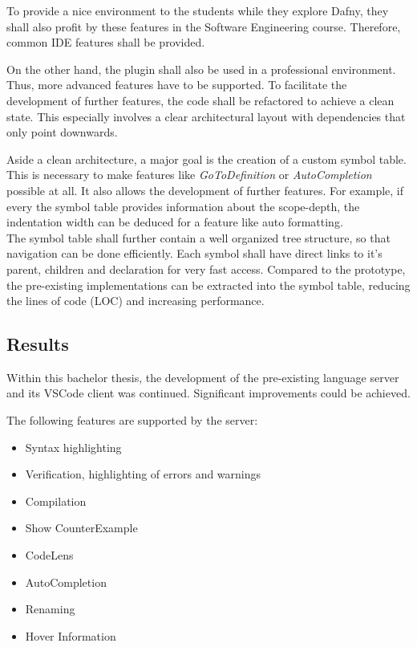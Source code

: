 To provide a nice environment to the students while they explore Dafny, they shall also profit by these features in the Software Engineering course.
Therefore, common IDE features shall be provided.

On the other hand, the plugin shall also be used in a professional environment.
Thus, more advanced features have to be supported.
To facilitate the development of further features, the code shall be refactored to achieve a clean state.
This especially involves a clear architectural layout with dependencies that only point downwards.

Aside a clean architecture, a major goal is the creation of a custom symbol table.
This is necessary to make features like \textit{GoToDefinition} or \textit{AutoCompletion} possible at all.
It also allows the development of further features.
For example, if every the symbol table provides information about the scope-depth, the indentation width can be deduced for a feature like auto formatting.\\

The symbol table shall further contain a well organized tree structure, so that navigation can be done efficiently.
Each symbol shall have direct links to it's parent, children and declaration for very fast access.
Compared to the prototype, the pre-existing implementations can be extracted into the symbol table, reducing the lines of code (LOC) and increasing performance.



\subsection{Results}
\label{section:managment_summary:results}
Within this bachelor thesis, the development of the pre-existing language server and its VSCode client was continued.
Significant improvements could be achieved.

The following features are supported by the server:
\begin{itemize}
    \item Syntax highlighting
    \item Verification, highlighting of errors and warnings
    \item Compilation
    \item Show CounterExample
    \item CodeLens
    \item AutoCompletion
    \item Renaming
    \item Hover Information
\end{itemize}

